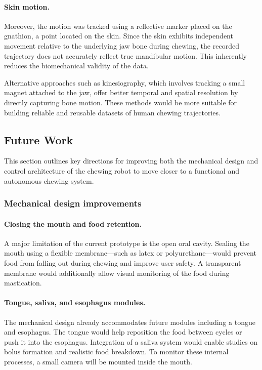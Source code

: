 \paragraph{Skin motion.}Moreover, the motion was tracked using a reflective marker placed on the gnathion, a point located on the skin. Since the skin exhibits independent movement relative to 
the underlying jaw bone during chewing, the recorded trajectory does not accurately reflect true mandibular motion. This inherently reduces the biomechanical validity of the data.

Alternative approaches such as kinesiography, which involves tracking a small magnet attached to the jaw, offer better temporal and spatial resolution by directly capturing 
bone motion. These methods would be more suitable for building reliable and reusable datasets of human chewing trajectories.

\subsection{Future Work}

This section outlines key directions for improving both the mechanical design and control architecture of the chewing robot to move closer to a functional and autonomous chewing system.

\subsubsection{Mechanical design improvements}

\paragraph{Closing the mouth and food retention.}  
A major limitation of the current prototype is the open oral cavity. Sealing the mouth using a flexible membrane—such as latex or polyurethane—would prevent food from falling out 
during chewing and improve user safety. A transparent membrane would additionally allow visual monitoring of the food during mastication.

\paragraph{Tongue, saliva, and esophagus modules.}  
The mechanical design already accommodates future modules including a tongue and esophagus. The tongue would help reposition the food between cycles or push it into the esophagus. 
Integration of a saliva system would enable studies on bolus formation and realistic food breakdown. To monitor these internal processes, a small camera will be mounted inside the mouth.

